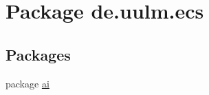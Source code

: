 \hypertarget{namespacede_1_1uulm_1_1ecs}{\section{Package de.\-uulm.\-ecs}
\label{namespacede_1_1uulm_1_1ecs}
}
\subsection*{Packages}
\begin{DoxyCompactItemize}
\item 
package \hyperlink{namespacede_1_1uulm_1_1ecs_1_1ai}{ai}
\end{DoxyCompactItemize}
